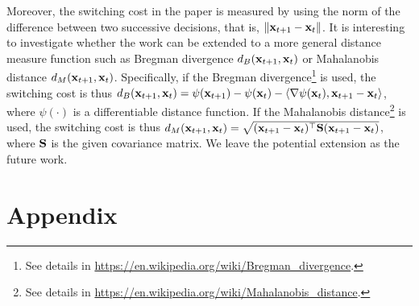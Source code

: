 \documentclass[journal]{IEEEtran}
\begin{document}
Moreover, the switching cost in the paper is measured by using the norm of the difference between two successive decisions, that is, $\lrnorm{\x_{t+1} - \x_t}$. It is interesting to investigate whether the work can be extended to a more general distance measure function such as Bregman divergence $d_B(\x_{t+1}, \x_t)$ or Mahalanobis distance $d_M(\x_{t+1}, \x_t)$. Specifically, if the Bregman divergence\footnote{See details in \url{https://en.wikipedia.org/wiki/Bregman_divergence}.} is used, the switching cost is thus $d_B(\x_{t+1}, \x_t) = \psi(\x_{t+1}) - \psi(\x_t) - \lrangle{\nabla \psi(\x_t), \x_{t+1} - \x_t}$, where $\psi(\cdot)$ is a differentiable distance function.   If the Mahalanobis distance\footnote{See details in \url{https://en.wikipedia.org/wiki/Mahalanobis_distance}.} is used, the switching cost is thus $d_M(\x_{t+1}, \x_t) = \sqrt{(\x_{t+1} - \x_t)\Tr \S (\x_{t+1} - \x_t)}$, where $\S$ is the given covariance matrix. We leave the potential extension as the future work. 



\section*{Appendix}
\end{document}
